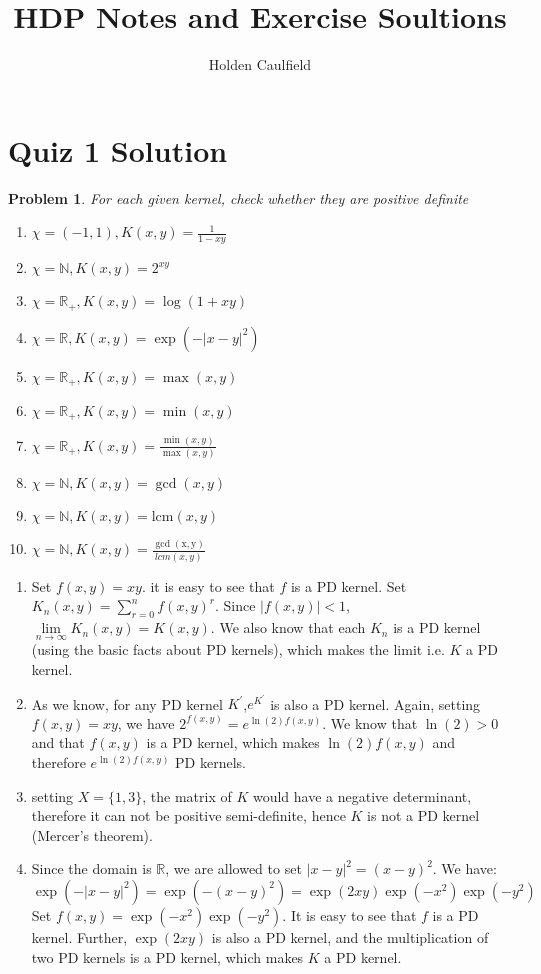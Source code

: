 \documentclass[12pt]{article}
\title{HDP Notes and Exercise Soultions}
\author{Holden Caulfield}
\newtheorem{ex}{Problem}
\begin{document}
	\centering	\section*{Quiz 1 Solution}
	
	\begin{bx}
		
	\begin{ex}
For each given kernel, check whether they are positive definite
\begin{enumerate}
	\item $\chi=(-1,1), K(x,y)=\frac{1}{1-xy}$
	\item $\chi=\mathbb{N}, K(x,y)=2^{xy}$
	\item $\chi=\mathbb{R}_{+}, K(x,y)=\log(1+xy)$
	\item $\chi=\mathbb{R}, K(x,y)=\exp(-|x-y|^2)$
	\item $\chi=\mathbb{R}_{+}, K(x,y)=\max(x,y)$
	\item $\chi=\mathbb{R}_{+}, K(x,y)=\min(x,y)$
	\item $\chi=\mathbb{R}_{+}, K(x,y)=\frac{\min(x,y)}{\max(x,y)}$
	\item $\chi=\mathbb{N}, K(x,y)=\gcd(x,y)$
	\item $\chi=\mathbb{N}, K(x,y)=\mathrm{lcm}(x,y)$
	\item $\chi=\mathbb{N}, K(x,y)=\frac{\mathrm{\gcd(x,y)}}{lcm(x,y)}$
\end{enumerate}
	\end{ex}
\tcblower
\begin{enumerate}
\item 
Set $f(x,y)=xy$. it is easy to see that $f$ is a PD kernel.
Set $K_n(x,y)=\sum_{r=0}^{n}f(x,y)^r$.
Since $|f(x,y)|< 1$,$\lim\limits_{n\rightarrow\infty}K_n(x,y)=K(x,y)$.
We also know that each $K_n$ is a PD kernel (using the basic facts about PD kernels), which makes the limit i.e. $K$ a PD kernel.

\item As we know, for any PD kernel $K^\prime$,$e^{K^\prime}$ is also a PD kernel. Again, setting $f(x,y)=xy$, we have $2^{f(x,y)}=e^{\ln(2)f(x,y)}$. We know that $\ln(2)>0$ and that $f(x,y)$ is a PD kernel, which makes $\ln(2)f(x,y)$ and therefore $e^{\ln(2)f(x,y)}$ PD kernels.

\item
setting $X=\{1,3\}$, the matrix of $K$ would have a negative determinant, therefore it can not be positive semi-definite, hence $K$ is not a PD kernel (Mercer's theorem).

\item Since the domain is $\mathbb{R}$, we are allowed to set $|x-y|^2=(x-y)^2$. We have:
$$
	\exp(-|x-y|^2)=\exp(-(x-y)^2)=\exp(2xy)\exp(-x^2)\exp(-y^2)
$$
Set $f(x,y)=\exp(-x^2)\exp(-y^2)$.
It is easy to see that $f$ is a PD kernel. Further, $\exp(2xy)$ is also a PD kernel, and the multiplication of two PD kernels is a PD kernel, which makes $K$ a PD kernel.


\end{enumerate}
\end{bx}
\end{document}
